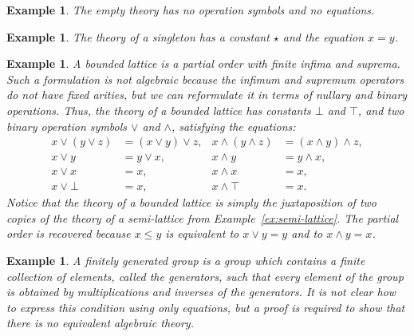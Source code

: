 \documentclass{amsart}
\newtheorem{example}[definition]{Example}
\begin{document}
\begin{example}
  \label{ex:theory-empty}
  The \emph{empty theory} has no operation symbols and no equations.
\end{example}

\begin{example}
  \label{ex:theory-singleton}
  The theory of a \emph{singleton} has a constant $\star$ and the equation $x = y$.
\end{example}

\begin{example}
  \label{ex:lattice}
  A bounded lattice is a partial order with finite infima and suprema. Such a formulation
  is not algebraic because the infimum and supremum operators do not have fixed arities,
  but we can reformulate it in terms of nullary and binary operations.
  Thus, the theory of a bounded lattice has constants $\bot$ and $\top$, and two binary
  operation symbols $\vee$ and $\wedge$, satisfying the equations:
  \begin{align*}
    x \vee (y \vee z) &= (x \vee y) \vee z,   &      x \wedge (y \wedge z) &= (x \wedge y) \wedge z,\\
    x \vee y &= y \vee x,                     &      x \wedge y &= y \wedge x,\\
    x \vee x &= x,                            &      x \wedge x &= x,\\
    x \vee \bot &= x,                         &      x \wedge \top &= x.
  \end{align*}
  Notice that the theory of a bounded lattice is simply the juxtaposition of two copies of
  the theory of a semi-lattice from Example~\ref{ex:semi-lattice}. The partial order is
  recovered because $x \leq y$ is equivalent to $x \vee y = y$ and to $x \wedge y = x$.
\end{example}

\begin{example}
  \label{ex:finitely-generated-group}
  A \emph{finitely generated group} is a group which contains a finite collection of
  elements, called the \emph{generators}, such that every element of the group is obtained
  by multiplications and inverses of the generators. It is not clear how to express this
  condition using only equations, but a proof is required to show that there is no
  equivalent algebraic theory.
\end{example}
\end{document}

